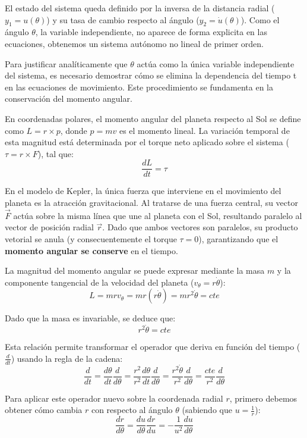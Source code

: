 \documentclass[]{report}
\begin{document}
El estado del sistema queda definido por la inversa de la distancia radial ($y_1 = u(\theta)$) y su tasa de cambio respecto al ángulo ($y_2 = \dot{u}(\theta)$). Como el ángulo $\theta$, la variable independiente, no aparece de forma explicita en las ecuaciones, obtenemos un sistema autónomo no lineal de primer orden.

Para justificar analíticamente que $\theta$ actúa como la única variable independiente del sistema, es necesario demostrar cómo se elimina la dependencia del tiempo t en las ecuaciones de movimiento. Este procedimiento se fundamenta en la conservación del momento angular.

En coordenadas polares, el momento angular del planeta respecto al Sol se define como $L = r \times p$, donde $p = mv$ es el momento lineal. La variación temporal de esta magnitud está determinada por el torque neto aplicado sobre el sistema ($\tau = r \times F$), tal que:
$$
\frac{dL}{dt} = \tau
$$

En el modelo de Kepler, la única fuerza que interviene en el movimiento del planeta es la atracción gravitacional. Al tratarse de una fuerza central, su vector $\vec{F}$ actúa sobre la misma línea que une al planeta con el Sol, resultando paralelo al vector de posición radial $\vec{r}$.
Dado que ambos vectores son paralelos, su producto vetorial se anula (y consecuentemente el torque $\tau = 0$), garantizando que el \textbf{momento angular se conserve} en el tiempo.

La magnitud del momento angular se puede expresar mediante la masa $m$ y la componente tangencial de la velocidad del planeta ($v_{\theta} = r \dot{\theta}$):
$$
L = m r v_{\theta} = m r \left(r \dot{\theta}\right) = m r^2 \dot{\theta} = cte
$$

Dado que la masa es invariable, se deduce que:
$$
r^2 \dot{\theta} = cte
$$

Esta relación permite transformar el operador que deriva en función del tiempo ($\frac{d}{dt}$) usando la regla de la cadena:
$$
\frac{d}{dt} = \frac{d\theta}{dt} \frac{d}{d\theta} = \frac{r^2}{r^2} \frac{d\theta}{dt} \frac{d}{d\theta} = \frac{r^2 \dot{\theta}}{r^2} \frac{d}{d\theta} = \frac{cte}{r^2} \frac{d}{d\theta}
$$

Para aplicar este operador nuevo sobre la coordenada radial $r$, primero debemos obtener cómo cambia $r$ con respecto al ángulo $\theta$ (sabiendo que $u = \frac{1}{r}$):
$$
\frac{dr}{d\theta} = \frac{du}{d\theta} \frac{dr}{du} = - \frac{1}{u^2} \frac{du}{d\theta} 
$$
\end{document}
